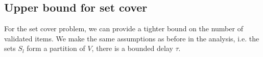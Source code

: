 





\subsection{Upper bound for set cover}

For the set cover problem, we can provide a tighter bound on the number of validated items.
We make the same assumptions as before in the \hogwild{} analysis, i.e. the sets $S_l$ form a partition of $V$, there is a bounded delay $\tau$.

